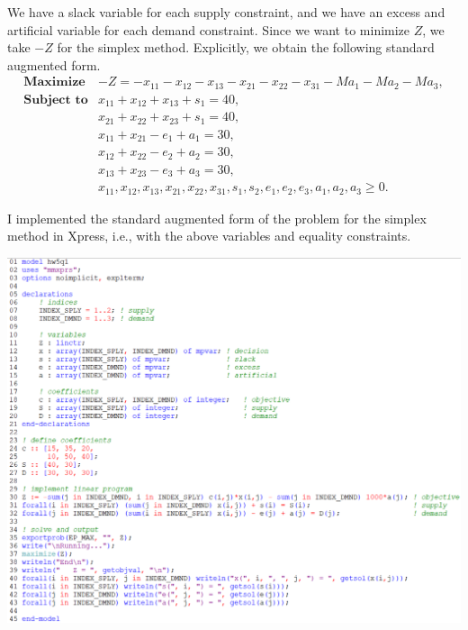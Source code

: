 \documentclass[12pt]{article}
\theoremstyle{definition}
\begin{document}
We have a slack variable for each supply constraint, and we have an excess and artificial variable for each demand constraint. Since we want to minimize $Z$, we take $-Z$ for the simplex method. Explicitly, we obtain the following standard augmented form. 
\[\begin{array}{ll}
    \textbf{Maximize}       & -Z = -x_{11} -x_{12} -x_{13} -x_{21} -x_{22} -x_{31} -Ma_1 -Ma_2 -Ma_3, \\
    \textbf{Subject to}     & x_{11} + x_{12} + x_{13} + s_{1} = 40, \\
                            & x_{21} + x_{22} + x_{23} + s_{1} = 40, \\
                            & x_{11} + x_{21} - e_{1} + a_1  = 30, \\
                            & x_{12} + x_{22} - e_{2} + a_2  = 30, \\
                            & x_{13} + x_{23} - e_{3} + a_3  = 30, \\
                            & x_{11}, x_{12}, x_{13}, x_{21}, x_{22}, x_{31}, s_1, s_2, e_1, e_2, e_3, a_1, a_2, a_3 \geq 0.
\end{array}\]

I implemented the standard augmented form of the problem for the simplex method in Xpress, i.e., with the above variables and equality constraints.

\noindent
\includegraphics[width=\textwidth]{code1a.png}
\end{document}
